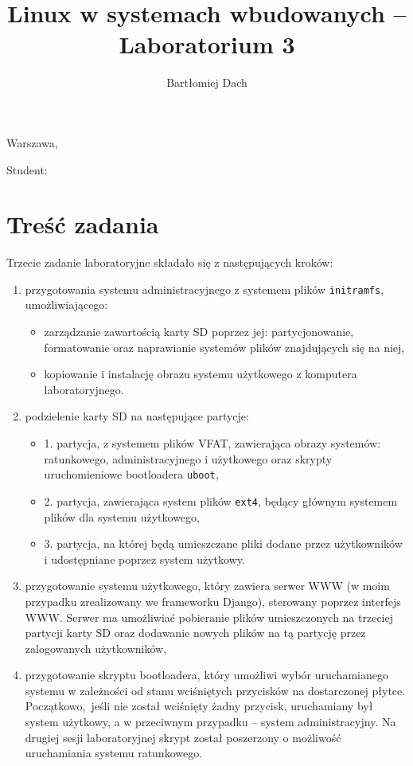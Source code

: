 \documentclass[10pt,a4paper]{article}
\title{Linux w systemach wbudowanych -- Laboratorium 3}
\author{Bartłomiej Dach}
\begin{document}
\makeatletter
\begin{flushright}
	Warszawa, \@date
\end{flushright}
\begin{center}
	\LARGE{\@title}
\end{center}
\vspace{0.25cm}
Student: \@author
\makeatother

\section{Treść zadania}

Trzecie zadanie laboratoryjne składało się z następujących kroków:

\begin{enumerate}
	\item przygotowania systemu administracyjnego z systemem plików \verb+initramfs+,
		umożliwiającego:
		\begin{itemize}
			\item zarządzanie zawartością karty SD poprzez jej: partycjonowanie,
				formatowanie oraz naprawianie systemów plików znajdujących się
				na niej,
			\item kopiowanie i instalację obrazu systemu użytkowego z komputera
				laboratoryjnego.
		\end{itemize}
	\item podzielenie karty SD na następujące partycje:
		\begin{itemize}
			\item 1. partycja, z systemem plików VFAT, zawierająca obrazy systemów:
				ratunkowego, administracyjnego i użytkowego oraz skrypty
				uruchomieniowe bootloadera \verb+uboot+,
			\item 2. partycja, zawierająca system plików \verb+ext4+, będący głównym
				systemem plików dla systemu użytkowego,
			\item 3. partycja, na której będą umieszczane pliki dodane przez
				użytkowników i udostępniane poprzez system użytkowy.
		\end{itemize}
	\item przygotowanie systemu użytkowego, który zawiera serwer WWW (w moim przypadku
		zrealizowany we frameworku Django), sterowany poprzez interfejs WWW. Serwer ma
		umożliwiać pobieranie plików umieszczonych na trzeciej partycji karty SD oraz
		dodawanie nowych plików na tą partycję przez zalogowanych użytkowników,
	\item przygotowanie skryptu bootloadera, który umożliwi wybór uruchamianego systemu
		w zależności od stanu wciśniętych przycisków na dostarczonej płytce.
		Początkowo, jeśli nie został wciśnięty żadny przycisk, uruchamiany był system
		użytkowy, a w przeciwnym przypadku -- system administracyjny. Na drugiej sesji
		laboratoryjnej skrypt został poszerzony o możliwość uruchamiania systemu
		ratunkowego.
\end{enumerate}
\end{document}

